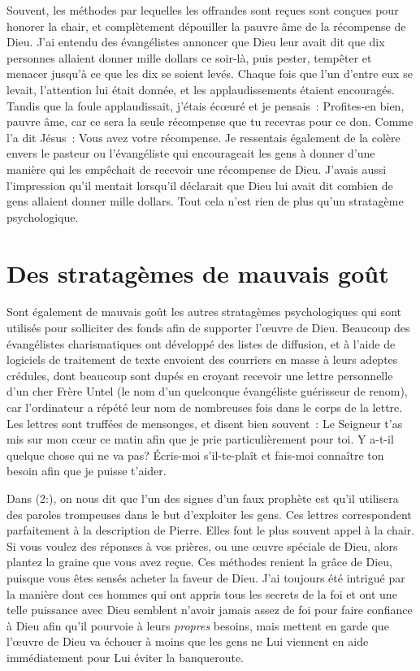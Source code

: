 \begin{specialpar}{}
Souvent, les méthodes par lequelles les offrandes sont reçues
 sont conçues pour honorer la chair, et complètement dépouiller
 la pauvre âme de la récompense de Dieu. J'ai entendu des évangélistes
 annoncer que Dieu leur avait dit que dix personnes allaient donner
 mille dollars ce soir-là, puis pester, tempêter et menacer jusqu'à
 ce que les dix se soient levés. Chaque fois que l'un d'entre eux
 se levait, l'attention lui était donnée, et les applaudissements
 étaient encouragés. Tandis que la foule applaudissait,
 j'étais écœuré et je pensais~: \og Profites-en bien, pauvre âme,
 car ce sera la seule récompense que tu recevras pour ce don. \fg{}
 Comme l'a dit Jésus~: \og Vous avez votre récompense. \fg{}
 Je ressentais également de la colère envers le pasteur
 ou l'évangéliste qui encourageait les gens à donner d'une manière
 qui les empêchait de recevoir une récompense de Dieu.
 J'avais aussi l'impression qu'il mentait lorsqu'il déclarait
 que Dieu lui avait dit combien de gens allaient donner mille dollars.
 Tout cela n'est rien de plus qu'un stratagème psychologique.
\end{specialpar}


\section*{Des stratagèmes de mauvais goût}

Sont également de mauvais goût les autres stratagèmes psychologiques
 qui sont utilisés pour solliciter des fonds afin de supporter l'œuvre
 de Dieu. Beaucoup des évangélistes charismatiques ont développé
 des listes de diffusion, et à l'aide de logiciels de traitement
 de texte envoient des courriers en masse à leurs adeptes crédules,
 dont beaucoup sont dupés en croyant recevoir une lettre personnelle
 d'un cher Frère Untel (le nom d'un quelconque évangéliste guérisseur
 de renom), car l'ordinateur a répété leur nom de nombreuses fois
 dans le corps de la lettre. Les lettres sont truffées de mensonges,
 et disent bien souvent~: \og Le Seigneur t'as mis sur mon cœur
 ce matin afin que je prie particulièrement pour toi.
 Y a-t-il quelque chose qui ne va pas? Écris-moi s'il-te-plaît
 et fais-moi connaître ton besoin afin que je puisse t'aider. \fg{}

Dans (2:), on nous dit que l'un des signes
 d'un faux prophète est qu'il utilisera des paroles trompeuses
 dans le but d'ex\-ploi\-ter les gens. Ces lettres correspondent parfaitement
 à la description de Pierre. Elles font le plus souvent appel à la chair.
 Si vous voulez des réponses à vos prières, ou une œuvre spéciale de Dieu,
 alors plantez la graine que vous avez reçue.
 Ces méthodes renient la grâce de Dieu, puisque vous êtes sensés acheter
 la faveur de Dieu. J'ai toujours été intrigué par la manière dont
 ces hommes qui ont appris tous les secrets de la foi
 et ont une telle puissance avec Dieu semblent n'avoir jamais assez
 de foi pour faire confiance à Dieu afin qu'il pourvoie
 à leurs \emph{propres} besoins, mais mettent en garde que l'œuvre de Dieu
 va échouer à moins que les gens ne Lui viennent en aide
 immédiatement pour Lui éviter la banqueroute.


